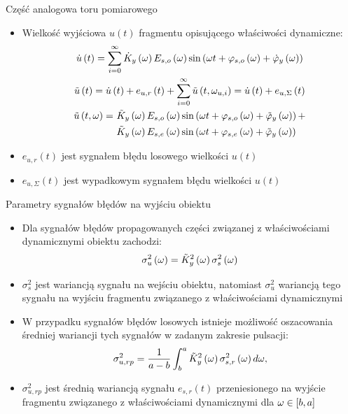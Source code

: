 \documentclass[12pt, polish, aspectratio = 169]{beamer}
\begin{document}
\begin{frame}{Część analogowa toru pomiarowego}
\begin{itemize}
\item Wielkość wyjściowa $u(t)$ fragmentu opisującego właściwości dynamiczne:
\begin{gather}
\dot{u} \left(t\right) = \sum _{i = 0} ^{\infty} \dot{K}_{y} \left(\omega\right) E_{s,o} \left(\omega\right) \sin \left( \omega t + \varphi_{s,o} \left(\omega\right) + \dot{\varphi}_{y} \left(\omega\right) \right) \label{eq:mid_cont_sum_ideal} \\
\tilde{u} \left(t\right) = \dot{u} \left(t\right) + e_{u,r} \left(t\right) + \sum _{i = 0} ^{\infty} \tilde{u} \left( t, \omega_{u,i} \right) = \dot{u} \left(t\right) + e_{u,\Sigma} \left(t\right) \label{eq:mid_cont_sum_real} \\
\begin{split}
\tilde{u} \left(t,\omega\right) =~
& \tilde{K}_{y} \left(\omega\right) E_{s,o} \left(\omega\right) \sin \left( \omega t + \varphi_{s,o} \left(\omega\right) + \tilde{\varphi}_{y} \left(\omega\right) \right) + \\
& \tilde{K}_{y} \left(\omega\right) E_{s,e} \left(\omega\right) \sin \left( \omega t + \varphi_{s,e} \left(\omega\right) + \tilde{\varphi}_{y} \left(\omega\right) \right)
\end{split}
\label{eq:mid_cont_omega_real}
\end{gather}
\item $e_{u,r}(t)$ jest sygnałem błędu losowego wielkości $u(t)$
\item $e_{u,\Sigma}(t)$ jest wypadkowym sygnałem błędu wielkości $u(t)$
\end{itemize}
\end{frame}

\begin{frame}{Parametry sygnałów błędów na wyjściu obiektu}
\begin{itemize}
\item Dla sygnałów błędów propagowanych części związanej z właściwościami dynamicznymi obiektu zachodzi:
\begin{equation}
\sigma_{u}^{2} \left(\omega\right) = \tilde{K}_{y}^{2} \left(\omega\right) \sigma_{s}^{2} \left(\omega\right) \label{eq:mid_cont_var_omega}
\end{equation}
\item $\sigma_{s}^{2}$ jest wariancją sygnału na wejściu obiektu, natomiast $\sigma_{u}^{2}$ wariancją tego sygnału na wyjściu fragmentu związanego z właściwościami dynamicznymi
\item W przypadku sygnałów błędów losowych istnieje możliwość oszacowania średniej wariancji tych sygnałów w zadanym zakresie pulsacji:
\begin{equation}
\sigma_{u,rp}^{2} = \frac{1}{a - b} \int _{b} ^{a} \tilde{K}_{y}^{2} \left(\omega\right) \sigma_{s,r}^{2} \left(\omega\right) d\omega \label{eq:mid_cont_var_rand},
\end{equation}
\item $\sigma_{u,rp}^{2}$ jest średnią wariancją sygnału $e_{s,r}(t)$ przeniesionego na wyjście fragmentu związanego z właściwościami dynamicznymi dla $\omega \in \interval{b}{a}$
\end{itemize}
\end{frame}
\end{document}
